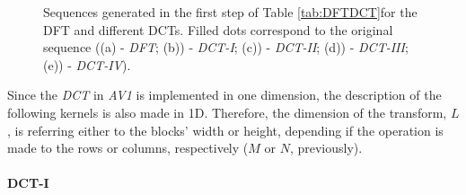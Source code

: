 \begin{figure}[!htpb]
    \centering 
        \begin{subfigure}[c]{\textwidth}
            \centering
            
            \caption{}
            \label{subfig:dft}
        \end{subfigure}
        \begin{subfigure}[c]{0.45\textwidth}
            \centering
            
            \caption{}
            \label{subfig:dct1}
        \end{subfigure}
        \begin{subfigure}[c]{0.45\textwidth}
            \centering
            
            \caption{}
            \label{subfig:dct2}
        \end{subfigure}
        \begin{subfigure}[c]{0.45\textwidth}
            \centering
            
            \caption{}
            \label{subfig:dct3}
        \end{subfigure}
        \begin{subfigure}[c]{0.45\textwidth}
            \centering
            
            \caption{}
            \label{subfig:dct4}
        \end{subfigure}
        \caption{Sequences generated in the first step of Table \ref{tab:DFTDCT}for the DFT and different DCTs. Filled dots correspond to the original sequence ((a) - \emph{DFT}; (b)) - \emph{DCT-I}; (c)) - \emph{DCT-II}; (d)) - \emph{DCT-III}; (e)) - \emph{DCT-IV}).}
    \label{fig:2NSeq}
\end{figure}


Since the \emph{DCT} in \emph{AV1} is implemented in one dimension, the description of the following kernels is also made in 1D. Therefore, the dimension of the transform, $L$, is referring either to the blocks' width or height, depending if the operation is made to the rows or columns, respectively ($M$ or $N$, previously).

\paragraph{DCT-I}

